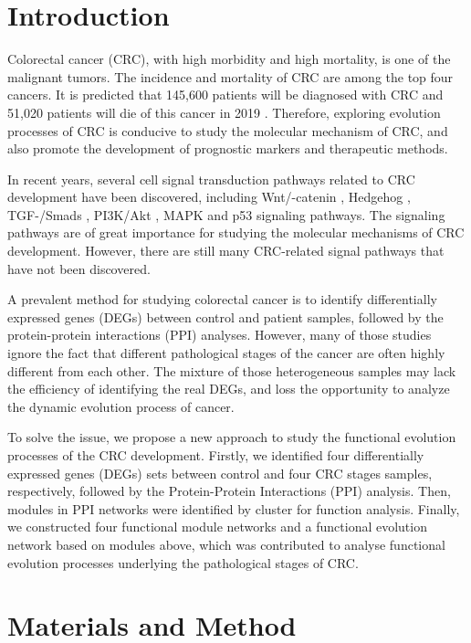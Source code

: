 \documentclass[utf8]{frontiersSCNS} %
\begin{document}
\section{Introduction}

Colorectal cancer (CRC), with high morbidity and high mortality, is one of the malignant tumors. The incidence and mortality of CRC are among the top four cancers. It is predicted that 145,600 patients will be diagnosed with CRC and 51,020 patients will die of this cancer in 2019 \citep{siegel2019cancer}. Therefore, exploring evolution processes of CRC is conducive to study the molecular mechanism of CRC, and also promote the 
development of prognostic markers and therapeutic methods.

In recent years, several cell signal
transduction pathways related to CRC development have
been discovered, including Wnt/-catenin \citep{klaus2008wnt,shim2015atractylochromene,oh2014green}, Hedgehog \citep{you2010ptch1}, TGF-/Smads \citep{xiong2002tgf}, PI3K/Akt \citep{rychahou2005targeted}, MAPK \citep{gulmann2009quantitative} and p53 \citep{li2015p53,russo2005tp53} signaling pathways. The signaling pathways are of great
importance for studying the molecular mechanisms of CRC
development. However, there are still many CRC-related signal
pathways that have not been discovered.

A prevalent method for studying colorectal cancer is to identify differentially expressed genes (DEGs) between control and patient samples, followed by the protein-protein interactions (PPI) analyses. However, many of those studies ignore the fact that different pathological stages of the cancer are often highly different from each other. The mixture of those heterogeneous samples may lack the efficiency of identifying the real DEGs, and loss the opportunity to analyze the dynamic evolution process of cancer.

To solve the issue, we propose a new approach to study the functional evolution processes of the CRC development. Firstly, we identified four differentially expressed genes (DEGs) sets between control and four CRC stages samples, respectively, followed by the Protein-Protein Interactions (PPI) analysis. Then, modules in PPI networks were identified by cluster for function analysis. Finally, we constructed four functional module networks and a functional evolution network based on modules above, which was contributed to analyse functional evolution processes underlying the pathological stages of CRC.


\section{Materials and Method}
\end{document}
